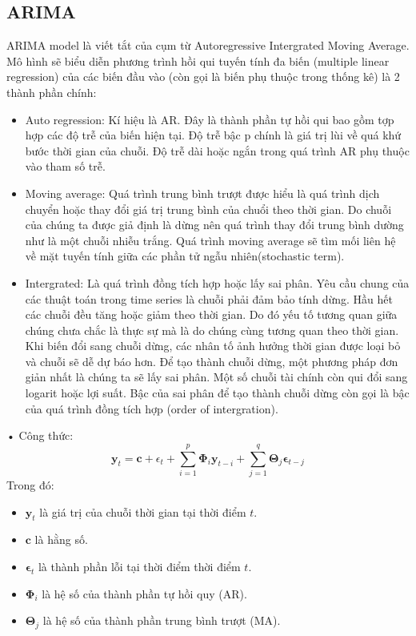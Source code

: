 \documentclass{article}
\begin{document}
\begin{multicols}{2}
    \subsection{ARIMA}
    ARIMA model là viết tắt của cụm từ Autoregressive 
    Intergrated Moving Average. Mô hình sẽ biểu diễn phương trình hồi qui tuyến tính đa biến (multiple linear regression) của các biến đầu vào (còn gọi là biến phụ thuộc trong thống kê) là 2 thành phần chính:\\
    \begin{itemize}
        \item Auto regression: Kí hiệu là AR. Đây là thành phần tự hồi qui bao gồm tợp hợp các độ trễ của biến hiện tại. Độ trễ bậc p chính là giá trị lùi về quá khứ  bước thời gian của chuỗi. Độ trễ dài hoặc ngắn trong quá trình AR phụ thuộc vào tham số trễ.
    \end{itemize}
    \begin{itemize}
        \item Moving average: Quá trình trung bình trượt được hiểu là quá trình dịch chuyển hoặc thay đổi giá trị trung bình của chuổi theo thời gian. Do chuỗi của chúng ta được giả định là dừng nên quá trình thay đổi trung bình dường như là một chuỗi nhiễu trắng. Quá trình moving average sẽ tìm mối liên hệ về mặt tuyến tính giữa các phần tử ngẫu nhiên(stochastic term). 
    \end{itemize}
    \begin{itemize}
        \item Intergrated: Là quá trình đồng tích hợp hoặc lấy sai phân. Yêu cầu chung của các thuật toán trong time series là chuỗi phải đảm bảo tính dừng. Hầu hết các chuỗi đều tăng hoặc giảm theo thời gian. Do đó yếu tố tương quan giữa chúng chưa chắc là thực sự mà là do chúng cùng tương quan theo thời gian. Khi biến đổi sang chuỗi dừng, các nhân tố ảnh hưởng thời gian được loại bỏ và chuỗi sẽ dễ dự báo hơn. Để tạo thành chuỗi dừng, một phương pháp đơn giản nhất là chúng ta sẽ lấy sai phân. Một số chuỗi tài chính còn qui đổi sang logarit hoặc lợi suất. Bậc của sai phân để tạo thành chuỗi dừng còn gọi là bậc của quá trình đồng tích hợp (order of intergration).
    \end{itemize}
     • Công thức:
       \begin{equation}
           \mathbf{y}_t = \mathbf{c} + {\epsilon}_t + \sum_{i=1}^{p} \mathbf{\Phi}_i \mathbf{y}_{t-i} + \sum_{j=1}^{q} \mathbf{\Theta}_j \boldsymbol{\epsilon}_{t-j} 
       \end{equation}  
   Trong đó:  
       \begin{itemize}
         \item \( \mathbf{y}_t \) là giá trị của chuỗi thời gian tại thời điểm \( t \).
         \item \( \mathbf{c} \) là hằng số.
         \item \( \boldsymbol{\epsilon}_t \) là thành phần lỗi tại thời điểm thời điểm \( t \).
         \item \( \mathbf{\Phi}_i \) là hệ số của thành phần tự hồi quy (AR).
         \item \( \mathbf{\Theta}_j \) là hệ số của thành phần trung bình trượt (MA).
       \end{itemize} 

\end{multicols}
\end{document}
